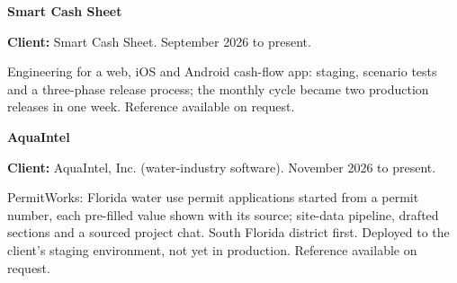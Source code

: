 \documentclass[letterpaper,9pt]{article}
\newcommand{\SubH}[1]{\noindent\colorbox{NVIAccentSoft}{\parbox{\dimexpr\linewidth-2\fboxsep\relax}{\fontsize{9.4}{11}\selectfont\bfseries\color{NVIAccentDark}#1}}\par\vspace{1pt}}
\renewcommand{\NVIBody}[1]{{\fontsize{8.7}{10.4}\selectfont\color{NVIInk}#1}}
\begin{document}
\begin{minipage}[t]{0.715\linewidth}
\SubH{Smart Cash Sheet}
\NVIBody{\textbf{Client:} Smart Cash Sheet. September 2026 to present.}\par
\NVIBody{Engineering for a web, iOS and Android cash-flow app: staging, scenario tests and a three-phase release process; the monthly cycle became two production releases in one week. Reference available on request.}\par
\SubH{AquaIntel}
\NVIBody{\textbf{Client:} AquaIntel, Inc. (water-industry software). November 2026 to present.}\par
\NVIBody{PermitWorks: Florida water use permit applications started from a permit number, each pre-filled value shown with its source; site-data pipeline, drafted sections and a sourced project chat. South Florida district first. Deployed to the client's staging environment, not yet in production. Reference available on request.}\par
\end{minipage}\hfill
\end{document}
